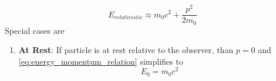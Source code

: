 \documentclass[11pt, a4paper]{article}
\begin{document}
\begin{equation*}
	E_{relativistic} \approx m_{0}c^{2} + \frac{p^{2}}{2m_{0}}
\end{equation*}
Special cases are
\begin{enumerate}
	\item \textbf{At Rest}: If particle is at rest relative to the observer, than $p=0$ and \eqref{eq:energy_momentum_relation} simplifies to 
	\begin{equation*}
		E_{0} = m_{0}c^{2} \tag{mass-energy equivalence}
	\end{equation*}
		                           
	

\end{enumerate}
\end{document}

